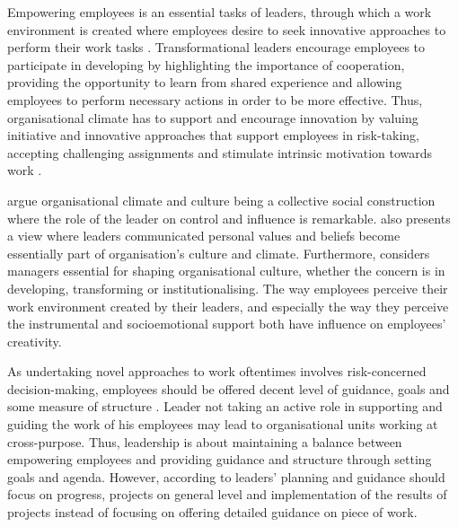Empowering employees is an essential tasks of leaders, through which a work environment is created where employees desire to seek innovative approaches to perform their work tasks \citep{jung2003role}. Transformational leaders encourage employees to participate in developing by highlighting the importance of cooperation, providing the opportunity to learn from shared experience and allowing employees to perform necessary actions in order to be more effective\citep{bass1990implications}. Thus, organisational climate has to support and encourage innovation \citep{mumford1988creativity} by valuing initiative and innovative approaches that support employees in risk-taking, accepting challenging assignments and stimulate intrinsic motivation towards work \citep{jung2003role}.

\citep{mumford2002leading} argue organisational climate and culture being a collective social construction where the role of the leader on control and influence is remarkable. \citep{schein2010organizational} also presents a view where leaders communicated personal values and beliefs become essentially part of organisation's culture and climate. Furthermore,\citep{jung2001transformational} considers managers essential for shaping organisational culture, whether the concern is in developing, transforming or institutionalising. The way employees perceive their work environment created by their leaders, and especially the way they perceive the instrumental and socioemotional support both have influence on employees' creativity. \citep{oldham1996employee}

As undertaking novel approaches to work oftentimes involves risk-concerned decision-making, employees should be offered decent level of guidance, goals and some measure of structure \citep{jung2003role}. Leader not taking an active role in supporting and guiding the work of his employees may lead to organisational units working at cross-purpose. Thus, leadership is about maintaining a balance between empowering employees and providing guidance and structure through setting goals and agenda. However, according to \citet{mumford2002leading} leaders' planning and guidance should focus on progress, projects on general level and implementation of the results of projects instead of focusing on offering detailed guidance on piece of work. 

